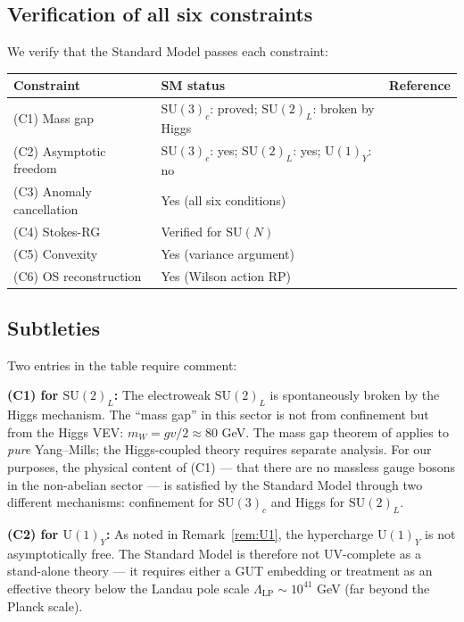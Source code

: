 \documentclass[12pt]{article}
\theoremstyle{definition}
\theoremstyle{remark}
\newcommand{\SU}{\mathrm{SU}}
\newcommand{\UU}{\mathrm{U}}
\begin{document}
\subsection{Verification of all six constraints}

We verify that the Standard Model passes each constraint:

\begin{center}
\renewcommand{\arraystretch}{1.4}
\begin{tabular}{lll}
\toprule
Constraint & SM status & Reference \\
\midrule
(C1) Mass gap & $\SU(3)_c$: proved; $\SU(2)_L$: broken by Higgs
  & \cite{Olbryk2026MG} \\
(C2) Asymptotic freedom & $\SU(3)_c$: yes; $\SU(2)_L$: yes;
  $\UU(1)_Y$: no & \cite{GrossWilczek1973} \\
(C3) Anomaly cancellation & Yes (all six conditions) &
  \cite{BIM1972} \\
(C4) Stokes-RG & Verified for $\SU(N)$ &
  \cite{OlbrykPsi2026} \\
(C5) Convexity & Yes (variance argument) &
  \cite{Griffiths1972} \\
(C6) OS reconstruction & Yes (Wilson action RP) &
  \cite{OS78} \\
\bottomrule
\end{tabular}
\end{center}

\subsection{Subtleties}

Two entries in the table require comment:

\textbf{(C1) for $\SU(2)_L$:} The electroweak $\SU(2)_L$ is
spontaneously broken by the Higgs mechanism.  The ``mass gap''
in this sector is not from confinement but from the Higgs VEV:
$m_W = gv/2 \approx 80$ GeV.  The mass gap theorem of
\cite{Olbryk2026MG} applies to \emph{pure} Yang--Mills; the
Higgs-coupled theory requires separate analysis.  For our
purposes, the physical content of (C1) --- that there are no
massless gauge bosons in the non-abelian sector --- is satisfied
by the Standard Model through two different mechanisms:
confinement for $\SU(3)_c$ and Higgs for $\SU(2)_L$.

\textbf{(C2) for $\UU(1)_Y$:} As noted in
Remark~\ref{rem:U1}, the hypercharge $\UU(1)_Y$ is not
asymptotically free.  The Standard Model is therefore not
UV-complete as a stand-alone theory --- it requires either a
GUT embedding or treatment as an effective theory below the
Landau pole scale $\Lambda_{\mathrm{LP}} \sim 10^{41}$ GeV
(far beyond the Planck scale).
\end{document}
